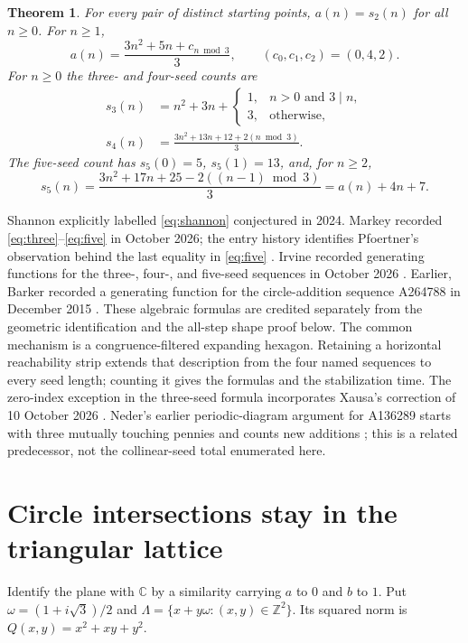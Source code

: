 \documentclass[11pt]{article}
\newtheorem{theorem}{Theorem}
\newcommand{\Z}{\mathbb Z}
\begin{document}
\begin{theorem}\label{thm:counts}
For every pair of distinct starting points, $a(n)=s_2(n)$ for all $n\geq0$.
For $n\geq1$,
\begin{equation}\label{eq:shannon}
 a(n)=\frac{3n^2+5n+c_{n\bmod3}}{3},\qquad(c_0,c_1,c_2)=(0,4,2).
\end{equation}
For $n\geq0$ the three- and four-seed counts are
\begin{align}
 s_3(n)&=n^2+3n+
 \begin{cases}1,&n>0\text{ and }3\mid n,\\3,&\text{otherwise},\end{cases}\label{eq:three}\\
 s_4(n)&=\frac{3n^2+13n+12+2(n\bmod3)}{3}.\label{eq:four}
\end{align}
The five-seed count has $s_5(0)=5$, $s_5(1)=13$, and, for $n\geq2$,
\begin{equation}\label{eq:five}
 s_5(n)=\frac{3n^2+17n+25-2((n-1)\bmod3)}{3}
       =a(n)+4n+7.
\end{equation}
\end{theorem}

Shannon explicitly labelled \eqref{eq:shannon} conjectured in 2024.
Markey recorded \eqref{eq:three}--\eqref{eq:five} in October 2026; the entry
history identifies Pfoertner's observation behind the last equality in
\eqref{eq:five} \cite[4--5 October 2026 discussion]{fivehistory}.
Irvine recorded generating functions for the three-, four-, and five-seed sequences
in October 2026 \cite{three,four,five}. Earlier, Barker recorded a generating
function for the circle-addition sequence A264788 in December 2015
\cite{barker}. These algebraic formulas are credited separately from the
geometric identification and the all-step shape proof below. The common
mechanism is a congruence-filtered expanding hexagon. Retaining a horizontal
reachability strip extends that description from the four named sequences to
every seed length; counting it gives the formulas and the stabilization time.
The zero-index exception in the three-seed formula incorporates Xausa's
correction of 10 October 2026 \cite{threehistory}.
Neder's earlier periodic-diagram argument for A136289 starts with three
mutually touching pennies and counts new additions \cite{neder}; this is
a related predecessor, not the collinear-seed total enumerated here.

\section{Circle intersections stay in the triangular lattice}
Identify the plane with $\mathbb C$ by a similarity carrying $a$ to $0$ and
$b$ to $1$. Put $\omega=(1+i\sqrt3)/2$ and
$\Lambda=\{x+y\omega:(x,y)\in\Z^2\}$. Its squared norm is
$Q(x,y)=x^2+xy+y^2$.
\end{document}
